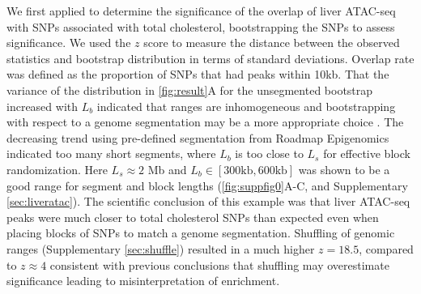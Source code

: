 We first applied \bootranges to determine the significance of the
overlap of liver ATAC-seq
\citep{CURRIN20211169} with SNPs associated with total cholesterol,
bootstrapping the SNPs to assess significance.
We used the $z$ score to measure the distance between the observed
statistics and bootstrap distribution in terms of standard deviations.
Overlap rate was defined as the proportion of
SNPs that had peaks within 10kb.
That the variance of the distribution in \cref{fig:result}A for the
unsegmented bootstrap increased with $L_b$ indicated that
ranges are inhomogeneous and
bootstrapping with respect to a genome
segmentation may be a more appropriate choice
\citep{bickel2010subsampling}. 
The decreasing trend using pre-defined segmentation from
Roadmap Epigenomics indicated too many short segments,
where $L_b$ is too close to $L_s$ for effective block randomization.
Here $L_s \approx 2$ Mb and $L_b \in [300\textrm{kb},600\textrm{kb}]$ was 
shown to be a good range for segment and block
lengths (\cref{fig:suppfig0}A-C, and Supplementary \cref{sec:liveratac}).
The scientific conclusion of this example was that liver ATAC-seq
peaks were
much closer to total cholesterol SNPs than expected even when placing
blocks of SNPs to match a genome segmentation. 
Shuffling of genomic ranges (Supplementary \cref{sec:shuffle})
resulted in a much higher $z = 18.5$, compared to $z \approx 4$ 
consistent with previous conclusions that shuffling may 
overestimate significance leading to misinterpretation of enrichment.


